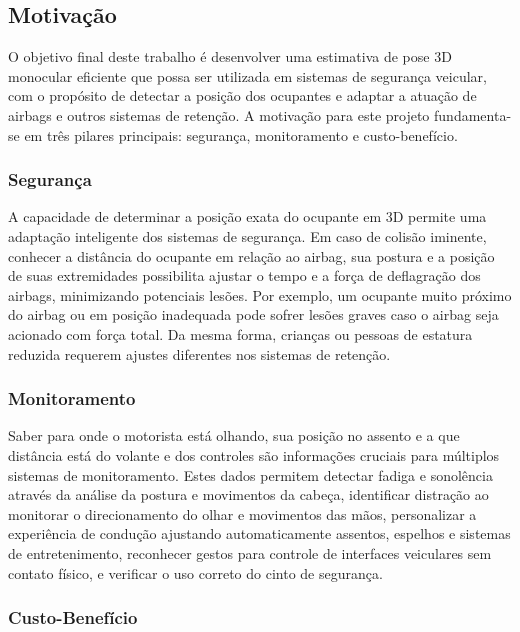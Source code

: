 \documentclass[12pt, a4paper]{article}
\begin{document}
\subsection{Motivação}

O objetivo final deste trabalho é desenvolver uma estimativa de pose 3D monocular eficiente que possa ser utilizada em sistemas de segurança veicular, com o propósito de detectar a posição dos ocupantes e adaptar a atuação de airbags e outros sistemas de retenção. A motivação para este projeto fundamenta-se em três pilares principais: segurança, monitoramento e custo-benefício.

\subsubsection{Segurança}

A capacidade de determinar a posição exata do ocupante em 3D permite uma adaptação inteligente dos sistemas de segurança. Em caso de colisão iminente, conhecer a distância do ocupante em relação ao airbag, sua postura e a posição de suas extremidades possibilita ajustar o tempo e a força de deflagração dos airbags, minimizando potenciais lesões. Por exemplo, um ocupante muito próximo do airbag ou em posição inadequada pode sofrer lesões graves caso o airbag seja acionado com força total. Da mesma forma, crianças ou pessoas de estatura reduzida requerem ajustes diferentes nos sistemas de retenção.

\subsubsection{Monitoramento}

Saber para onde o motorista está olhando, sua posição no assento e a que distância está do volante e dos controles são informações cruciais para múltiplos sistemas de monitoramento. Estes dados permitem detectar fadiga e sonolência através da análise da postura e movimentos da cabeça, identificar distração ao monitorar o direcionamento do olhar e movimentos das mãos, personalizar a experiência de condução ajustando automaticamente assentos, espelhos e sistemas de entretenimento, reconhecer gestos para controle de interfaces veiculares sem contato físico, e verificar o uso correto do cinto de segurança.

\subsubsection{Custo-Benefício}
\end{document}
